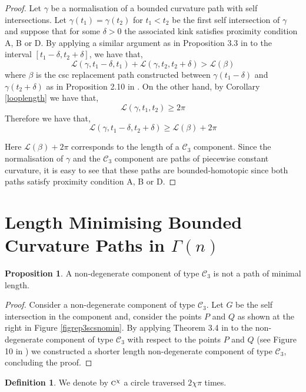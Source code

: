 \documentclass{amsart}
\theoremstyle{definition}
\newtheorem{definition}[theorem]{Definition}
\newtheorem{proposition}[theorem]{Proposition}
\theoremstyle{remark}
\numberwithin{equation}{section}
\begin{document}
\begin{proof} Let $\gamma$ be a normalisation of a bounded curvature path with self intersections. Let $\gamma(t_1)=\gamma(t_2)$ for $t_1<t_2$ be the first self intersection of $\gamma$ and suppose that for some $\delta>0$ the associated kink satisfies proximity condition {\sc A}, {\sc B} or {\sc D}. By applying a similar argument as in Proposition 3.3 in \cite{papera} to the interval $[t_1-\delta,t_2+\delta]$, we have that,
$${\mathcal L(\gamma, t_1-\delta, t_1)}+{\mathcal L(\gamma, t_2, t_2+\delta)}>{\mathcal L(\beta)}$$
where $\beta$ is the {\sc csc} replacement path constructed between $\gamma(t_1-\delta)$ and $\gamma(t_2+\delta)$ as in Proposition 2.10 in \cite{papera}. On the other hand, by Corollary \ref{looplength} we have that,
$${\mathcal L}(\gamma, t_1, t_2)\geq 2 \pi $$
 Therefore we have that,
 $${\mathcal L}(\gamma, t_1-\delta, t_2+\delta)\geq{\mathcal L(\beta)}+2 \pi $$

Here ${\mathcal L(\beta)}+2 \pi $ corresponds to the length of a ${\mathscr C}_3$ component. Since the normalisation of $\gamma$ and the ${\mathscr C}_3$ component are paths of piecewise constant curvature, it is easy to see that these paths are bounded-homotopic since both paths satisfy proximity condition {\sc A}, {\sc B} or {\sc D}. 
 \end{proof}

\section {Length Minimising Bounded Curvature Paths in $\Gamma(n)$}

\begin{proposition} \label{c3nomin}A non-degenerate component of type ${\mathscr C}_3$ is not a path of minimal length.
\end{proposition}

\begin{proof} Consider a non-degenerate component of type ${\mathscr C}_3$. Let $G$ be the self intersection in the component and, consider the points $P$ and $Q$ as shown at the right in Figure \ref{figrep3scsnomin}. By applying Theorem 3.4 in \cite{papera} to the non-degenerate component of type ${\mathscr C}_3$ with respect to the points $P$ and $Q$ (see Figure 10 in \cite{papera}) we constructed a shorter length non-degenerate component of type ${\mathscr C}_3$, concluding the proof.
\end{proof}

\begin{definition} We denote by $\mbox{\sc c}^\chi $ a circle traversed $2 \chi  \pi $ times.
\end{definition}
\end{document}
